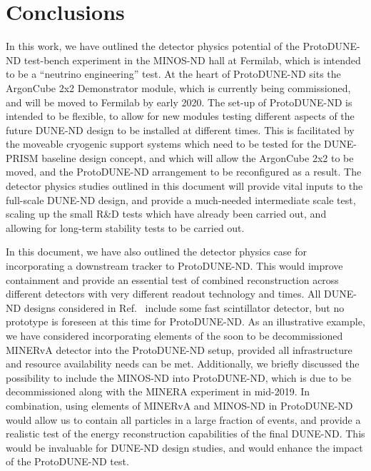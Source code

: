 \section{Conclusions}
\label{sec:conclusions}

In this work, we have outlined the detector physics potential of the ProtoDUNE-ND test-bench experiment in the MINOS-ND hall at Fermilab, which is intended to be a ``neutrino engineering'' test. At the heart of ProtoDUNE-ND sits the ArgonCube 2x2 Demonstrator module, which is currently being commissioned, and will be moved to Fermilab by early 2020. The set-up of ProtoDUNE-ND is intended to be flexible, to allow for new modules testing different aspects of the future DUNE-ND design to be installed at different times. This is facilitated by the moveable cryogenic support systems which need to be tested for the DUNE-PRISM baseline design concept, and which will allow the ArgonCube 2x2 to be moved, and the ProtoDUNE-ND arrangement to be reconfigured as a result. The detector physics studies outlined in this document will provide vital inputs to the full-scale DUNE-ND design, and provide a much-needed intermediate scale test, scaling up the small R\&D tests which have already been carried out, and allowing for long-term stability tests to be carried out.

In this document, we have also outlined the detector physics case for incorporating a downstream tracker to ProtoDUNE-ND. 
This would improve containment and provide an essential test of combined reconstruction across different detectors with very different readout technology and times. 
All DUNE-ND designs considered in Ref.~\cite{dune_ndcsg} include some fast scintillator detector, but no prototype is foreseen at this time for ProtoDUNE-ND. 
As an illustrative example, we have considered incorporating elements of the soon to be decommissioned MINERvA detector into the ProtoDUNE-ND setup, provided all infrastructure and resource availability needs can be met. 
Additionally, we briefly discussed the possibility to include the MINOS-ND into ProtoDUNE-ND, which is due to be decommissioned along with the MINERA experiment in mid-2019. In combination, using elements of MINERvA and MINOS-ND in ProtoDUNE-ND would allow us to contain all particles in a large fraction of events, and provide a realistic test of the energy reconstruction capabilities of the final DUNE-ND. This would be invaluable for DUNE-ND design studies, and would enhance the impact of the ProtoDUNE-ND test.
